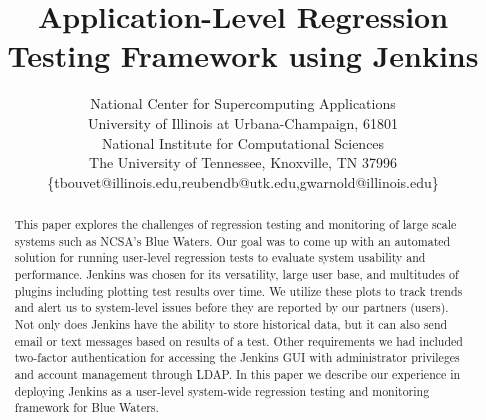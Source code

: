 \documentclass[10pt, conference, compsocconf]{IEEEtran}
\begin{document}
\title{Application-Level Regression Testing Framework using Jenkins}





%
\author{
National Center for Supercomputing Applications\\
University of Illinois at Urbana-Champaign, 61801\\
National Institute for Computational Sciences\\
The University of Tennessee, Knoxville, TN 37996\\
\{tbouvet@illinois.edu,reubendb@utk.edu,gwarnold@illinois.edu\}}





\maketitle
\thispagestyle{plain}

\begin{abstract}
This paper explores the challenges of regression testing and monitoring of large scale systems such as NCSA's Blue Waters. 
Our goal was to come up with an automated solution for running user-level regression tests to evaluate system usability and performance. 
Jenkins was chosen for its versatility, large user base, and multitudes of plugins including plotting test results over time. 
We utilize these plots to track trends and alert us to system-level issues before they are reported by our partners (users). 
Not only does Jenkins have the ability to store historical data, but it can also send email or text messages based on results of a test. 
Other requirements we had included two-factor authentication for accessing the Jenkins GUI with administrator privileges and account management through LDAP. 
In this paper we describe our experience in deploying Jenkins as a user-level system-wide regression testing and monitoring framework for Blue Waters.
\end{abstract}
\end{document}
